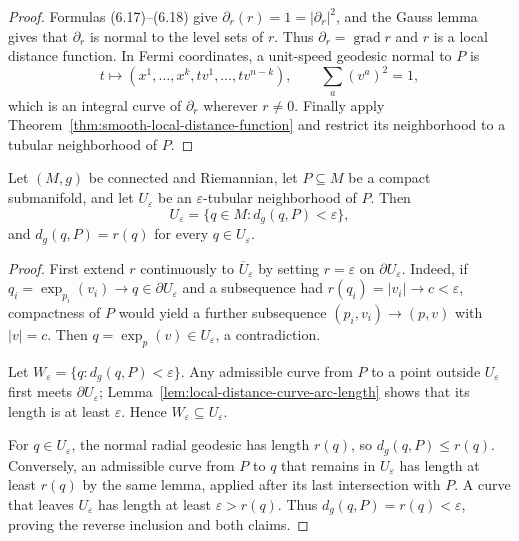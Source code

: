 \begin{proof}
\sketch Formulas (6.17)--(6.18) give
$\partial_r(r)=1=|\partial_r|^2$, and the Gauss lemma gives that
$\partial_r$ is normal to the level sets of $r$. Thus
$\partial_r=\operatorname{grad}r$ and $r$ is a local distance function.
In Fermi coordinates, a unit-speed geodesic normal to $P$ is
\[
t\longmapsto(x^1,\ldots,x^k,tv^1,\ldots,tv^{n-k}),
\qquad \sum_a(v^a)^2=1,
\]
which is an integral curve of $\partial_r$ wherever $r\neq0$. Finally apply
Theorem~\ref{thm:smooth-local-distance-function} and restrict its neighborhood
to a tubular neighborhood of $P$.
\end{proof}

\begin{theorem}
\label{thm:tubular-neighborhood-metric-distance}

Let $(M,g)$ be connected and Riemannian, let $P\subseteq M$ be a compact
submanifold, and let $U_\varepsilon$ be an $\varepsilon$-tubular neighborhood
of $P$. Then
\[
U_\varepsilon=\{q\in M:d_g(q,P)<\varepsilon\},
\]
and $d_g(q,P)=r(q)$ for every $q\in U_\varepsilon$.
\end{theorem}

\begin{proof}
\sketch First extend $r$ continuously to $\overline U_\varepsilon$ by setting
$r=\varepsilon$ on $\partial U_\varepsilon$. Indeed, if
$q_i=\exp_{p_i}(v_i)\to q\in\partial U_\varepsilon$ and a subsequence had
$r(q_i)=|v_i|\to c<\varepsilon$, compactness of $P$ would yield a further
subsequence $(p_i,v_i)\to(p,v)$ with $|v|=c$. Then
$q=\exp_p(v)\in U_\varepsilon$, a contradiction.

Let $W_\varepsilon=\{q:d_g(q,P)<\varepsilon\}$. Any admissible curve from
$P$ to a point outside $U_\varepsilon$ first meets
$\partial U_\varepsilon$; Lemma~\ref{lem:local-distance-curve-arc-length}
shows that its length is at least $\varepsilon$. Hence
$W_\varepsilon\subseteq U_\varepsilon$.

For $q\in U_\varepsilon$, the normal radial geodesic has length $r(q)$, so
$d_g(q,P)\leq r(q)$. Conversely, an admissible curve from $P$ to $q$ that
remains in $U_\varepsilon$ has length at least $r(q)$ by the same lemma,
applied after its last intersection with $P$. A curve that leaves
$U_\varepsilon$ has length at least $\varepsilon>r(q)$. Thus
$d_g(q,P)=r(q)<\varepsilon$, proving the reverse inclusion and both claims.
\end{proof}

